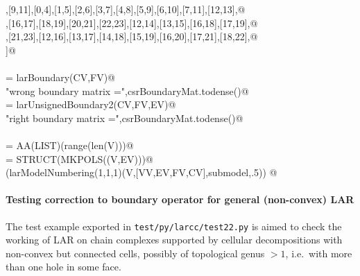 \documentclass[11pt,oneside]{article}    %
\begin{document}
\begin{flushleft}
\begin{list}{}{}
\mbox{}\verb@[8,10],[9,11],[0,4],[1,5],[2,6],[3,7],[4,8],[5,9],[6,10],[7,11],[12,13],@\\
\mbox{}\verb@[14,15],[16,17],[18,19],[20,21],[22,23],[12,14],[13,15],[16,18],[17,19],@\\
\mbox{}\verb@[20,22],[21,23],[12,16],[13,17],[14,18],[15,19],[16,20],[17,21],[18,22],@\\
\mbox{}\verb@[19,23]]@\\
\mbox{}\verb@@\\
\mbox{}\verb@csrBoundaryMat = larBoundary(CV,FV)@\\
\mbox{}\verb@print "wrong boundary matrix =",csrBoundaryMat.todense()@\\
\mbox{}\verb@csrBoundaryMat = larUnsignedBoundary2(CV,FV,EV)@\\
\mbox{}\verb@print "right boundary matrix =",csrBoundaryMat.todense()@\\
\mbox{}\verb@@\\
\mbox{}\verb@VV = AA(LIST)(range(len(V)))@\\
\mbox{}\verb@submodel = STRUCT(MKPOLS((V,EV)))@\\
\mbox{}\verb@VIEW(larModelNumbering(1,1,1)(V,[VV,EV,FV,CV],submodel,.5)) @\\
\mbox{}\verb@@{\NWsep}
\end{list}
\vspace{-2ex}
\end{flushleft}


\paragraph{Testing correction to boundary operator for general (non-convex) LAR}

The test example exported in \texttt{test/py/larcc/test22.py} is aimed to check the working of LAR on chain complexes supported by cellular decompositions with non-convex but connected cells, possibly of topological genus $>1$, i.e.~with more than one hole in some face.
\end{document}
